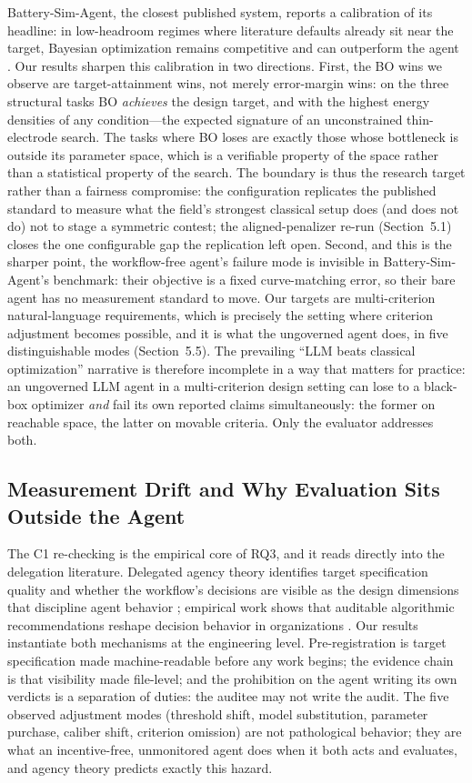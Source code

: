 Battery-Sim-Agent, the closest published system, reports a
calibration of its headline: in low-headroom regimes where literature
defaults already sit near the target, Bayesian optimization remains
competitive and can outperform the agent \cite{chen2026battery}. Our
results sharpen this calibration in two directions. First, the BO wins we
observe are target-attainment wins, not merely error-margin wins: on the
three structural tasks BO \emph{achieves} the design target, and with the
highest energy densities of any condition---the expected signature of an
unconstrained thin-electrode search. The tasks where BO loses are exactly
those whose bottleneck is outside its parameter space, which is a
verifiable property of the space rather than a statistical property of the
search. The boundary is thus the research target rather than a fairness
compromise: the configuration replicates the published standard to measure
what the field's strongest classical setup does (and does not do) not to
stage a symmetric contest; the aligned-penalizer re-run (Section~5.1)
closes the one configurable gap the replication left open. Second, and this is the sharper point, the workflow-free agent's
failure mode is invisible in Battery-Sim-Agent's benchmark: their objective is a fixed curve-matching error, so their
bare agent has no measurement standard to move. Our targets are multi-criterion
natural-language requirements, which is precisely the setting where
criterion adjustment becomes possible, and it is what the ungoverned agent
does, in five distinguishable modes (Section~5.5). The prevailing
``LLM beats classical optimization'' narrative is therefore incomplete in a
way that matters for practice: an ungoverned LLM agent in a multi-criterion
design setting can lose to a black-box optimizer \emph{and} fail its own
reported claims simultaneously: the former on reachable space, the latter
on movable criteria. Only the evaluator addresses both.

\subsection{Measurement Drift and Why Evaluation Sits Outside the Agent}

The C1 re-checking is the empirical core of RQ3, and it reads directly
into the delegation literature. Delegated agency theory identifies target
specification quality and whether the workflow's decisions are visible as the design dimensions
that discipline agent behavior \cite{delegatedagency2026}; empirical work
shows that auditable algorithmic recommendations reshape decision behavior
in organizations \cite{nikpayam2024aiassisted}. Our results instantiate
both mechanisms at the engineering level. Pre-registration is target
specification made machine-readable before any work begins; the evidence
chain is that visibility made file-level; and the prohibition on the
agent writing its own verdicts is a separation of duties: the auditee may
not write the audit. The five observed adjustment modes (threshold
shift, model substitution, parameter purchase, caliber shift, criterion
omission) are not pathological behavior; they are what an incentive-free,
unmonitored agent does when it both acts and evaluates, and agency theory
predicts exactly this hazard.

